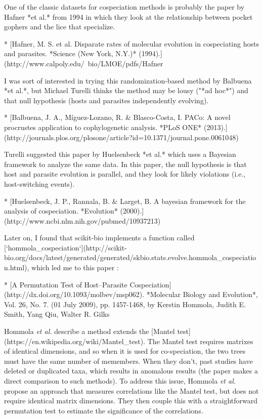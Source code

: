 One of the classic datasets for cospeciation methods is probably the paper by 
Hafner *et al.* from 1994 in which they look at the relationship between pocket
gophers and the lice that specialize. 

* [Hafner, M. S. et al. Disparate rates of molecular evolution in cospeciating hosts and parasites. *Science (New York, N.Y.)* (1994).](http://www.calpoly.edu/~bio/LMOE/pdfs/Hafner%

I was sort of interested in trying this randomization-based method by Balbuena 
*et al.*, but Michael Turelli thinks the method may be lousy ("*ad hoc*") and 
that null hypothesis (hosts and parasites independently evolving).

* [Balbuena, J. A., Míguez-Lozano, R. & Blasco-Costa, I. PACo: A novel procrustes application to cophylogenetic analysis. *PLoS ONE* (2013).](http://journals.plos.org/plosone/article?id=10.1371/journal.pone.0061048)

Turelli suggested this paper by Huelsenbeck *et al.* which uses a Bayesian
framework to analyze the same data. In this paper, the null hypothesis is that
host and parasite evolution is parallel, and they look for likely violations
(i.e., host-switching events).

* [Huelsenbeck, J. P., Rannala, B. & Larget, B. A bayesian framework for the analysis of cospeciation. *Evolution* (2000).](http://www.ncbi.nlm.nih.gov/pubmed/10937213)

Later on, I found that scikit-bio implements a function called [`hommola_cospeciation`](http://scikit-bio.org/docs/latest/generated/generated/skbio.stats.evolve.hommola_cospeciation.html), which led me to this paper :

* [A Permutation Test of Host–Parasite Cospeciation](http://dx.doi.org/10.1093/molbev/msp062). *Molecular Biology and Evolution*, Vol. 26, No. 7. (01 July 2009), pp. 1457-1468, by Kerstin Hommola, Judith E. Smith, Yang Qiu, Walter R. Gilks

Hommola {\em et al.} describe a method extends the 
[Mantel test](https://en.wikipedia.org/wiki/Mantel_test). The Mantel test
requires matrixes of identical dimensions, and so when it is used for 
co-speciation, the two trees must have the same number of memembers. When
they don't, past studies have deleted or duplicated taxa, which results in
anomalous results (the paper makes a direct comparison to such methods).
To address this issue, Hommola {\em et al.} propose an approach that measures
correlations like the Mantel test, but does not require identical matrix
dimensions. They then couple this with a straightforward permutation test 
to estimate the significance of the correlations.

